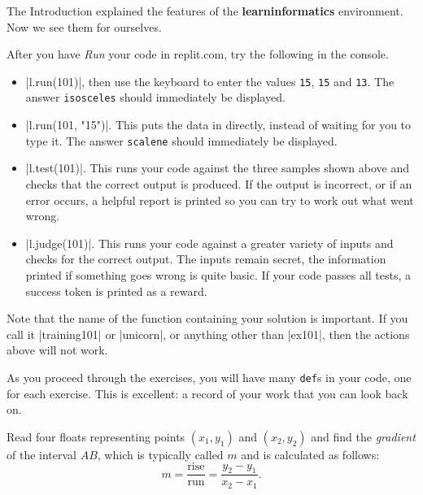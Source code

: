 \Running

The Introduction explained the features of the \textbf{learninformatics} environment. Now
we see them for ourselves.

After you have \emph{Run} your code in replit.com, try the following in the console.
\begin{itemize}
  \item \pycode|l.run(101)|, then use the keyboard to enter the values \texttt{15},
    \texttt{15} and \texttt{13}. The answer \texttt{isosceles} should immediately be
    displayed.
  \item \pycode|l.run(101, "15\n")|. This puts the data in directly, instead of
    waiting for you to type it. The answer \texttt{scalene} should immediately be
    displayed.
  \item \pycode|l.test(101)|. This runs your code against the three samples shown
    above and checks that the correct output is produced. If the output is incorrect, or
    if an error occurs, a helpful report is printed so you can try to work out what went
    wrong.
  \item \pycode|l.judge(101)|. This runs your code against a greater variety of inputs and
    checks for the correct output. The inputs remain secret, the information printed if
    something goes wrong is quite basic. If your code passes all tests, a success token is
    printed as a reward.
\end{itemize}

Note that the name of the function containing your solution is important. If you call it
\pycode|training101| or \pycode|unicorn|, or anything other than \pycode|ex101|, then the
actions above will not work.

\begin{tcolorbox}
  As you proceed through the exercises, you will have many \texttt{def}s in your code, one
  for each exercise. This is excellent: a record of your work that you can look back on.
\end{tcolorbox}



\clearpage


\Question Read four floats representing points $(x_1,y_1)$ and
$(x_2,y_2)$ and find the \emph{gradient} of the interval $AB$, which is typically called
$m$ and is calculated as follows:
\[ m = \frac{\mathrm{rise}}{\mathrm{run}} = \frac{y_2 - y_1}{x_2 - x_1}.\]


